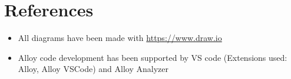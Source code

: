 \chapter{References}
\begin{itemize}
    \item All diagrams have been made with \url{https://www.draw.io}
    \item Alloy code development has been supported by VS code (Extensions used: Alloy, Alloy VSCode) and Alloy Analyzer
\end{itemize}
